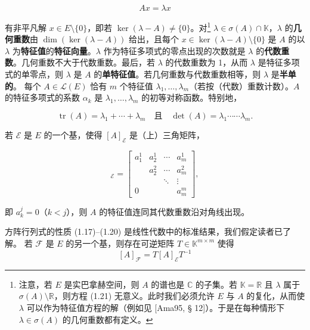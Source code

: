 \begin{remark}
\begin{items}
\begin{equation}
Ax = \lambda x\tag{1.21}
\end{equation}

有非平凡解 $ x \in E \setminus \{0\} $，即若 $ \ker(\lambda - A) \ne \{0\} $。对\footnote{注意，若 $ E $ 是实巴拿赫空间，则 $ A $ 的谱也是 $ \mathbb{C} $ 的子集。若 $ \mathbb{K} = \mathbb{R} $ 且 $ \lambda $ 属于 $ \sigma(A)\setminus\mathbb{R} $，则方程 (1.21) 无意义。此时我们必须允许 $ E $ 与 $ A $ 的复化，从而使 $ \lambda $ 可以作为特征值方程的解（例如见 [Ama95, § 12]）。于是在每种情形下 $ \lambda \in \sigma(A) $ 的几何重数都有定义。} $ \lambda \in \sigma(A) \cap \mathbb{K} $，$ \lambda $ 的\textbf{几何重数}由 $ \dim(\ker(\lambda - A)) $ 给出，且每个 $ x \in \ker(\lambda - A)\setminus\{0\} $ 是 $ A $ 的以 $ \lambda $ 为\textbf{特征值}的\textbf{特征向量}。$ \lambda $ 作为特征多项式的零点出现的次数就是 $ \lambda $ 的\textbf{代数重数}。几何重数不大于代数重数。最后，若 $ \lambda $ 的代数重数为 1，从而 $ \lambda $ 是特征多项式的单零点，则 $ \lambda $ 是 $ A $ 的\textbf{单特征值}。若几何重数与代数重数相等，则 $ \lambda $ 是\textbf{半单的}。
每个 $ A \in \mathcal{L}(E) $ 恰有 $ m $ 个特征值 $ \lambda_{1},\ldots,\lambda_{m} $（若按（代数）重数计数）。$ A $ 的特征多项式的系数 $ \alpha_{k} $ 是 $ \lambda_{1},\ldots,\lambda_{m} $ 的初等对称函数。特别地，

\begin{equation}
\operatorname{tr}(A) = \lambda_{1} + \cdots + \lambda_{m} \quad \text{且} \quad \det(A) = \lambda_{1}\cdots\cdots\lambda_{m} .\tag{1.22}
\end{equation}

若 $ \mathcal{E} $ 是 $ E $ 的一个基，使得 $ [A]_{\mathcal{E}} $ 是（上）三角矩阵，

\begin{equation}
[A]_{\mathcal{E}} = \begin{bmatrix} a_{1}^{1} & a_{2}^{1} & \cdots & a_{m}^{1} \\ & a_{2}^{2} & \cdots & a_{m}^{2} \\ & & \ddots & \vdots \\ 0 & & & a_{m}^{m} \end{bmatrix} ,\tag{1.23}
\end{equation}

即 $ a_{k}^{j} = 0 $（$ k < j $），则 $ A $ 的特征值连同其代数重数沿对角线出现。

\proofhead
方阵行列式的性质 (1.17)–(1.20) 是线性代数中的标准结果，我们假定读者已了解。
若 $ \mathcal{F} $ 是 $ E $ 的另一个基，则存在可逆矩阵 $ T \in \mathbb{K}^{m\times m} $ 使得
\[
[A]_{\mathcal{F}} = T[A]_{\mathcal{E}}T^{-1}
\]


\end{items}
\end{remark}
